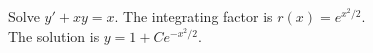 {Solve $y' + xy = x$.}
{The integrating factor is $r(x)=e^{x^2/2}$. \\
The solution is $y=1+Ce^{-x^2/2}$.}